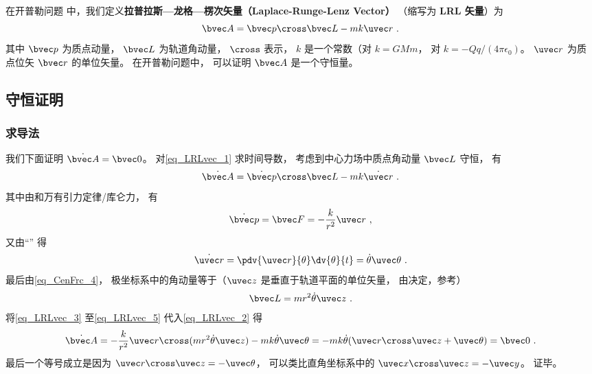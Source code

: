 

在开普勒问题%
中，我们定义\textbf{拉普拉斯—龙格—楞次矢量（Laplace-Runge-Lenz Vector）} （缩写为 \textbf{LRL 矢量}）为
\begin{equation}\label{eq_LRLvec_1}
\bvec A = \bvec p \cross \bvec L - mk \uvec r~.
\end{equation}
其中 $\bvec p$ 为质点动量， $\bvec L$ 为轨道角动量， $\cross$ 表示， $k$ 是一个常数（对 $k = GMm$， 对 $k = -Qq/(4\pi\epsilon_0)$。 $\uvec r$ 为质点位矢 $\bvec r$ 的单位矢量。 在开普勒问题中， 可以证明 $\bvec A$ 是一个守恒量。

\subsection{守恒证明}
\subsubsection{求导法}
我们下面证明 $\dot{\bvec A} = \bvec 0$。 对\autoref{eq_LRLvec_1} 求时间导数， 考虑到中心力场中质点角动量 $\bvec L$ 守恒， 有
\begin{equation}\label{eq_LRLvec_2}
\dot{\bvec A} = \dot{\bvec p}\cross \bvec L  - mk\dot{\uvec r}~.
\end{equation}
其中由和万有引力定律/库仑力， 有
\begin{equation}\label{eq_LRLvec_3}
\dot{\bvec p} = \bvec F = - \frac{k}{r^2}\uvec r~,
\end{equation}
又由“” 得
\begin{equation}\label{eq_LRLvec_4}
\dot{\uvec r} = \pdv{\uvec r}{\theta} \dv{\theta}{t} = \dot\theta\uvec \theta~.
\end{equation}
最后由\autoref{eq_CenFrc_4}， 极坐标系中的角动量等于（$\uvec z$ 是垂直于轨道平面的单位矢量， 由决定，参考）
\begin{equation}\label{eq_LRLvec_5}
\bvec L = mr^2\dot \theta \uvec z~.
\end{equation}
将\autoref{eq_LRLvec_3} 至\autoref{eq_LRLvec_5} 代入\autoref{eq_LRLvec_2} 得
\begin{equation}
\dot{\bvec A} = -\frac{k}{r^2}\uvec r \cross (mr^2\dot\theta\uvec z) - mk\dot\theta\uvec\theta
=-mk\dot\theta (\uvec r\cross \uvec z + \uvec \theta)
= \bvec 0~.
\end{equation}
最后一个等号成立是因为 $\uvec r\cross\uvec z = -\uvec\theta$， 可以类比直角坐标系中的 $\uvec x\cross\uvec z = -\uvec y$。 证毕。
